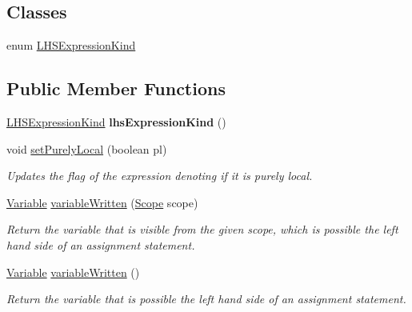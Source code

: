\subsection*{Classes}
\begin{DoxyCompactItemize}
\item 
enum \hyperlink{enumedu_1_1udel_1_1cis_1_1vsl_1_1civl_1_1model_1_1IF_1_1expression_1_1LHSExpression_1_1LHSExpressionKind}{L\+H\+S\+Expression\+Kind}
\end{DoxyCompactItemize}
\subsection*{Public Member Functions}
\begin{DoxyCompactItemize}
\item 
\hypertarget{interfaceedu_1_1udel_1_1cis_1_1vsl_1_1civl_1_1model_1_1IF_1_1expression_1_1LHSExpression_a1272e954b0c2cf89a7ef4b8af70cde84}{}\hyperlink{enumedu_1_1udel_1_1cis_1_1vsl_1_1civl_1_1model_1_1IF_1_1expression_1_1LHSExpression_1_1LHSExpressionKind}{L\+H\+S\+Expression\+Kind} {\bfseries lhs\+Expression\+Kind} ()\label{interfaceedu_1_1udel_1_1cis_1_1vsl_1_1civl_1_1model_1_1IF_1_1expression_1_1LHSExpression_a1272e954b0c2cf89a7ef4b8af70cde84}

\item 
void \hyperlink{interfaceedu_1_1udel_1_1cis_1_1vsl_1_1civl_1_1model_1_1IF_1_1expression_1_1LHSExpression_a3533c159b737846babf791045ce0264d}{set\+Purely\+Local} (boolean pl)
\begin{DoxyCompactList}\small\item\em Updates the flag of the expression denoting if it is purely local. \end{DoxyCompactList}\item 
\hyperlink{interfaceedu_1_1udel_1_1cis_1_1vsl_1_1civl_1_1model_1_1IF_1_1variable_1_1Variable}{Variable} \hyperlink{interfaceedu_1_1udel_1_1cis_1_1vsl_1_1civl_1_1model_1_1IF_1_1expression_1_1LHSExpression_a7c69569e91a23d48be0c6ecea456011f}{variable\+Written} (\hyperlink{interfaceedu_1_1udel_1_1cis_1_1vsl_1_1civl_1_1model_1_1IF_1_1Scope}{Scope} scope)
\begin{DoxyCompactList}\small\item\em Return the variable that is visible from the given scope, which is possible the left hand side of an assignment statement. \end{DoxyCompactList}\item 
\hyperlink{interfaceedu_1_1udel_1_1cis_1_1vsl_1_1civl_1_1model_1_1IF_1_1variable_1_1Variable}{Variable} \hyperlink{interfaceedu_1_1udel_1_1cis_1_1vsl_1_1civl_1_1model_1_1IF_1_1expression_1_1LHSExpression_a78e628bb1248aa61856dcf4a921aff52}{variable\+Written} ()
\begin{DoxyCompactList}\small\item\em Return the variable that is possible the left hand side of an assignment statement. \end{DoxyCompactList}\end{DoxyCompactItemize}


